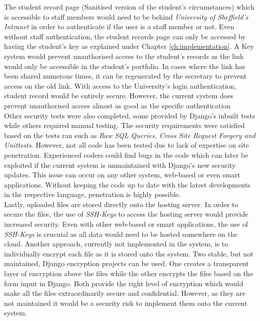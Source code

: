 \documentclass[../main.tex]{subfiles}
\begin{document}
The student record page (Sanitised version of the student's circumstances) which is accessible to staff members would need to be behind \textit{University of Sheffield's Intranet} in order to authenticate if the user is a staff member or not. Even without staff authentication, the student records page can only be accessed by having the student's key as explained under Chapter \ref{ch:implementation}. A Key system would prevent unauthorised access to the student's records as the link would only be accessible in the student's portfolio. In cases where the link has been shared numerous times, it can be regenerated by the secretary to prevent access on the old link. With access to the University's login authentication, student record would be entirely secure. However, the current system does prevent unauthorised access almost as good as the specific authentication\\[4mm]

Other security tests were also completed, some provided by Django's inbuilt tests while others required manual testing. The security requirements were satisfied based on the tests ran such as \textit{Raw SQL Queries, Cross Site Request Forgery and Unittests}. However, not all code has been tested due to lack of expertise on site penetration. Experienced coders could find bugs in the code which can later be exploited if the current system is unmaintained with Django's new security updates. This issue can occur on any other system, web-based or even smart applications. Without keeping the code up to date with the latest developments in the respective language, penetration is highly possible.   \\[4mm]

Lastly, uploaded files are stored directly onto the hosting server. In order to secure the files, the use of \textit{SSH-Keys} to access the hosting server would provide increased security. Even with other web-based or smart applications, the use of \textit{SSH-Keys} is crucuial as all data would need to be hosted somewhere on the cloud. Another approach, currently not implemented in the system, is to individually encrypt each file as it is stored onto the system. Two stable, but not maintained, Django encryption projects can be used. One creates a transparent layer of encryption above the files\cite{danielquinn} while the other encrypts the files based on the form input in Django\cite{ruddra}. Both provide the right level of encryption which would make all the files extraordinarily secure and confidential. However, as they are not maintained it would be a security risk to implement them onto the current system. 
\end{document}

